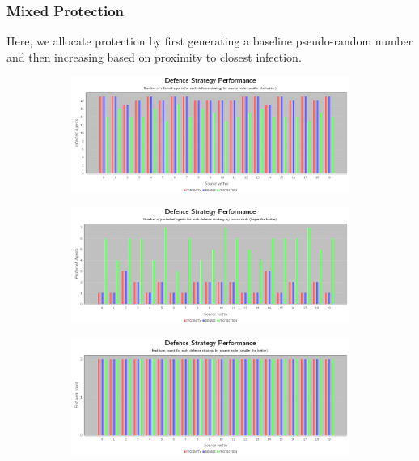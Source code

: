 \documentclass[results.tex]{subfiles}
\begin{document}
\newpage

\subsubsection{Mixed Protection}

Here, we allocate protection by first generating a baseline pseudo-random number and then increasing based on proximity to closest infection.



\newpage

\begin{figure}[!ht]
\centering
     \begin{subfigure}[b]{0.9\textwidth}
         \centering
         \includegraphics[width=\textwidth]{Mixed/MixedInfectedChart}
         \label{fig:com-mix-infected}
     \end{subfigure}
     \vfill
     \begin{subfigure}[b]{0.9\textwidth}
         \centering
         \includegraphics[width=\textwidth]{Mixed/MixedProtectedChart}
         \label{fig:com-mix-protected}
     \end{subfigure}
     \vfill
     \begin{subfigure}[b]{0.9\textwidth}
         \centering
         \includegraphics[width=\textwidth]{Mixed/MixedEndTurnChart}

\end{subfigure}
\end{figure}
\end{document}
